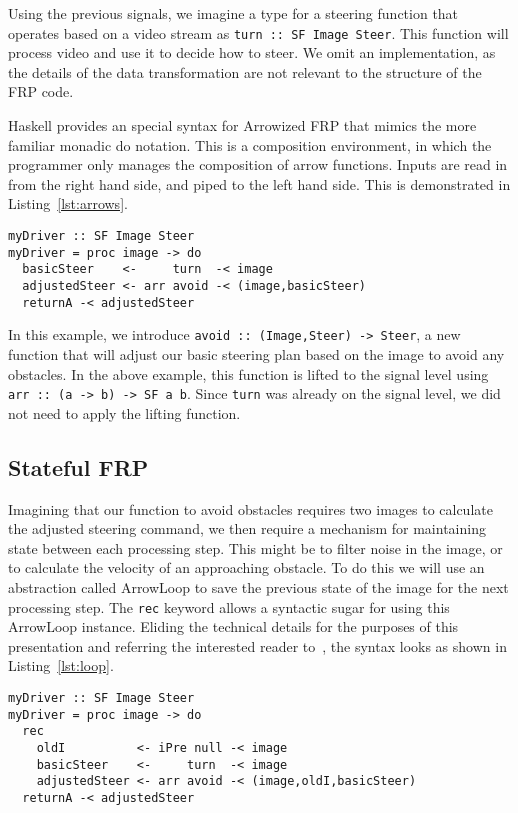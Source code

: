Using the previous signals, we imagine a type for a steering function that operates based on a video stream as \texttt{turn :: SF Image Steer}.
This function will process video and use it to decide how to steer.
We omit an implementation, as the details of the data transformation are not relevant to the structure of the FRP code.

Haskell provides an special syntax for Arrowized FRP that mimics the more familiar monadic do notation.
This is a composition environment, in which the programmer only manages the composition of arrow functions.
Inputs are read in from the right hand side, and piped to the left hand side.
This is demonstrated in Listing~\ref{lst:arrows}.

\begin{lstlisting}[float,floatplacement=h!,caption=Basic Arrowized FRP syntax,label=lst:arrows]
myDriver :: SF Image Steer
myDriver = proc image -> do
  basicSteer    <-     turn  -< image
  adjustedSteer <- arr avoid -< (image,basicSteer)
  returnA -< adjustedSteer
\end{lstlisting}

In this example, we introduce \texttt{avoid :: (Image,Steer) -> Steer}, a new function that will adjust our basic steering plan based on the image to avoid any obstacles.
In the above example, this function is lifted to the signal level using \texttt{arr :: (a -> b) -> SF a b}.
Since \texttt{turn} was already on the signal level, we did not need to apply the lifting function.

\subsection{Stateful FRP}

Imagining that our function to avoid obstacles requires two images to calculate the adjusted steering command, we then require a mechanism for maintaining state between each processing step.
This might be to filter noise in the image, or to calculate the velocity of an approaching obstacle.
To do this we will use an abstraction called ArrowLoop to  save the previous state of the image for the next processing step.
The \texttt{rec} keyword allows a syntactic sugar for using this ArrowLoop instance.
Eliding the technical details for the purposes of this presentation and referring the interested reader to~\cite{paterson2001icfp}, the syntax looks as shown in Listing~\ref{lst:loop}.

\begin{lstlisting}[float,caption=Using ArrowLoop to send feedback,label=lst:loop]
myDriver :: SF Image Steer
myDriver = proc image -> do
  rec
    oldI          <- iPre null -< image
    basicSteer    <-     turn  -< image
    adjustedSteer <- arr avoid -< (image,oldI,basicSteer)
  returnA -< adjustedSteer
\end{lstlisting}

